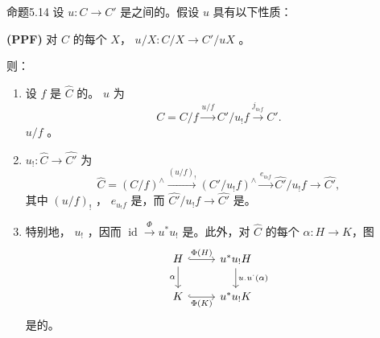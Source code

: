 \begin{SGAresult}{命题}{5.14}
设 $u:C\to C'$ 是之间的。假设 $u$ 具有以下性质：

\textbf{(PPF)} 对 $C$ 的每个 $X$， $u/X:C/X\to C'/uX$ 。

则：
\begin{enumerate}
\item 设 $f$ 是 $\widehat C$ 的。 $u$ 为
\[C=C/f\xrightarrow{u/f}C'/u_!f\xrightarrow{j_{u_!f}}C'.\]
 $u/f$ 。
\item {} $u_!:\widehat C\to\widehat{C'}$ 为
\[\widehat C=(C/f)^{\wedge}\xrightarrow{(u/f)_!}(C'/u_!f)^{\wedge}\xrightarrow{e_{u_!f}}\widehat{C'}/u_!f\longrightarrow\widehat{C'},\]
其中 $(u/f)_!$ ， $e_{u_!f}$ 是，而 $\widehat{C'}/u_!f\to\widehat{C'}$ 是。
\item 特别地， $u_!$ ，因而 $\operatorname{id}\xrightarrow{\Phi}u^*u_!$ 是。此外，对 $\widehat C$ 的每个 $\alpha:H\to K$，图
\[\begin{tikzcd}H\arrow[r,hook,"\Phi(H)"]\arrow[d,"\alpha"']&u^*u_!H\arrow[d,"u_{\cdot}u^{\cdot}(\alpha)"]\\K\arrow[r,hook,"\Phi(K)"']&u^*u_!K\end{tikzcd}\]
是的。
\end{enumerate}
\end{SGAresult}
